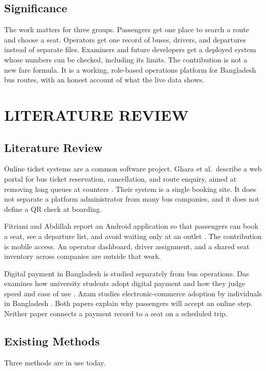 \documentclass[12pt,a4paper]{report}
\begin{document}
\section{Significance}
The work matters for three groups. Passengers get one place to search a route and choose a seat. Operators get one record of buses, drivers, and departures instead of separate files. Examiners and future developers get a deployed system whose numbers can be checked, including its limits. The contribution is not a new fare formula. It is a working, role-based operations platform for Bangladesh bus routes, with an honest account of what the live data shows.

\chapter{LITERATURE REVIEW}
\label{ch:lit}

\section{Literature Review}
Online ticket systems are a common software project. Ghara et al.\ describe a web portal for bus ticket reservation, cancellation, and route enquiry, aimed at removing long queues at counters \cite{ghara2022}. Their system is a single booking site. It does not separate a platform administrator from many bus companies, and it does not define a QR check at boarding.

Fitriani and Abdillah report an Android application so that passengers can book a seat, see a departure list, and avoid waiting only at an outlet \cite{fitriani2017}. The contribution is mobile access. An operator dashboard, driver assignment, and a shared seat inventory across companies are outside that work.

Digital payment in Bangladesh is studied separately from bus operations. Das examines how university students adopt digital payment and how they judge speed and ease of use \cite{das2024}. Azam studies electronic-commerce adoption by individuals in Bangladesh \cite{azam2023}. Both papers explain why passengers will accept an online step. Neither paper connects a payment record to a seat on a scheduled trip.

\section{Existing Methods}
Three methods are in use today.
\end{document}
